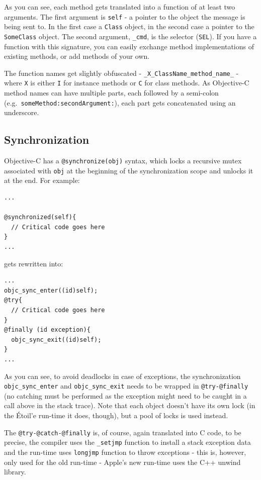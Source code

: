 As you can see, each method gets translated into a function of at least two arguments. The first argument is \verb=self= - a pointer to the object the message is being sent to. In the first case a \verb=Class= object, in the second case a pointer to the \verb=SomeClass= object. The second argument, \verb=_cmd=, is the selector (\verb=SEL=). If you have a function with this signature, you can easily exchange method implementations of existing methods, or add methods of your own.

The function names get slightly obfuscated - \verb=_X_ClassName_method_name_= - where \verb=X= is either \verb=I= for instance methods or \verb=C= for class methods. As Objective-C method names can have multiple parts, each followed by a semi-colon (e.g.\ \verb=someMethod:secondArgument:=), each part gets concatenated using an underscore.

\subsection{Synchronization}

Objective-C has a \verb=@synchronize(obj)= syntax, which locks a recursive mutex associated with \verb=obj= at the beginning of the synchronization scope and unlocks it at the end. For example:

\begin{verbatim}
...

@synchronized(self){
  // Critical code goes here
}
...
\end{verbatim}

gets rewritten into:

\begin{verbatim}
...
objc_sync_enter((id)self);
@try{
  // Critical code goes here
}
@finally (id exception){
  objc_sync_exit((id)self);
}
...
\end{verbatim}

As you can see, to avoid deadlocks in case of exceptions, the synchronization \verb=objc_sync_enter= and \verb=objc_sync_exit= needs to be wrapped in \verb=@try-@finally= (no catching must be performed as the exception might need to be caught in a call above in the stack trace). Note that each object doesn't have its own lock (in the \'Etoil'e run-time it does, though), but a pool of locks is used instead.

The \verb=@try-@catch-@finally= is, of course, again translated into C code, to be precise, the compiler uses the \verb=_setjmp= function to install a stack exception data and the run-time uses \verb=longjmp= function to throw exceptions - this is, however, only used for the old run-time - Apple's new run-time uses the C++ unwind library.

